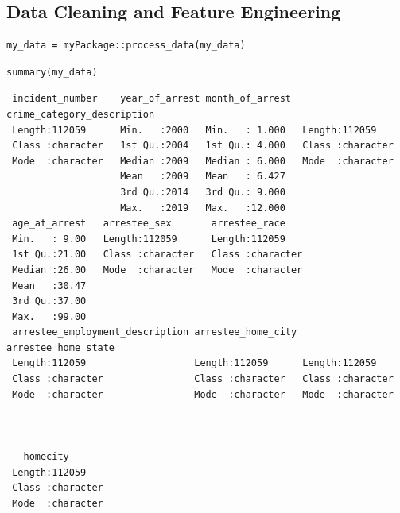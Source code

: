 \documentclass[
  article]{jss}
\begin{document}
\hypertarget{data-cleaning-and-feature-engineering}{%
\subsection{Data Cleaning and Feature
Engineering}\label{data-cleaning-and-feature-engineering}}

\begin{verbatim}
my_data = myPackage::process_data(my_data)
\end{verbatim}

\begin{verbatim}
summary(my_data)
\end{verbatim}

\begin{verbatim}
 incident_number    year_of_arrest month_of_arrest  crime_category_description
 Length:112059      Min.   :2000   Min.   : 1.000   Length:112059             
 Class :character   1st Qu.:2004   1st Qu.: 4.000   Class :character          
 Mode  :character   Median :2009   Median : 6.000   Mode  :character          
                    Mean   :2009   Mean   : 6.427                             
                    3rd Qu.:2014   3rd Qu.: 9.000                             
                    Max.   :2019   Max.   :12.000                             
 age_at_arrest   arrestee_sex       arrestee_race     
 Min.   : 9.00   Length:112059      Length:112059     
 1st Qu.:21.00   Class :character   Class :character  
 Median :26.00   Mode  :character   Mode  :character  
 Mean   :30.47                                        
 3rd Qu.:37.00                                        
 Max.   :99.00                                        
 arrestee_employment_description arrestee_home_city arrestee_home_state
 Length:112059                   Length:112059      Length:112059      
 Class :character                Class :character   Class :character   
 Mode  :character                Mode  :character   Mode  :character   
                                                                       
                                                                       
                                                                       
   homecity        
 Length:112059     
 Class :character  
 Mode  :character  
                   
                   
                   
\end{verbatim}
\end{document}
